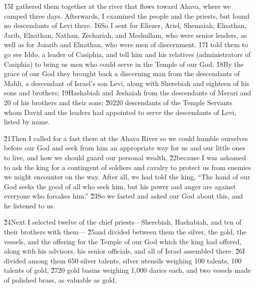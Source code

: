 \v{15}I gathered them together at the river that flows toward Ahava, where we camped three days. Afterwards, I examined the people and the priests, but found no descendants of Levi there. \v{16}So I sent for Eliezer, Ariel, Shemaiah, Elnathan, Jarib, Elnathan, Nathan, Zechariah, and Meshullam, who were senior leaders, as well as for Joiarib and Elnathan, who were men of discernment. \v{17}I told them to go see Iddo, a leader of Casiphia, and tell him and his relatives (administrators of Casiphia) to bring us men who could serve in the Temple of our God. \v{18}By the grace of our God they brought back a discerning man from the descendants of Mahli, a descendant of Israel's son Levi, along with Sherebiah and eighteen of his sons and brothers; \v{19}Hashabiah and Jeshaiah from the descendants of Merari and 20 of his brothers and their sons; \v{20}220 descendants of the Temple Servants whom David and the leaders had appointed to serve the descendants of Levi, listed by name.

\v{21}Then I called for a fast there at the Ahava River so we could humble ourselves before our God and seek from him an appropriate way for us and our little ones to live, and how we should guard our personal wealth, \v{22}because I was ashamed to ask the king for a contingent of soldiers and cavalry to protect us from enemies we might encounter on the way. After all, we had told the king, ``The hand of our God seeks the good of all who seek him, but his power and anger are against everyone who forsakes him.'' \v{23}So we fasted and asked our God about this, and he listened to us.

\v{24}Next I selected twelve of the chief priests---Sherebiah, Hashabiah, and ten of their brothers with them--- \v{25}and divided between them the silver, the gold, the vessels, and the offering for the Temple of our God which the king had offered, along with his advisors, his senior officials, and all of Israel assembled there. \v{26}I divided among them 650 silver talents, silver utensils weighing 100 talents, 100 talents of gold, \v{27}20 gold basins weighing 1,000 darics each, and two vessels made of polished brass, as valuable as gold.

